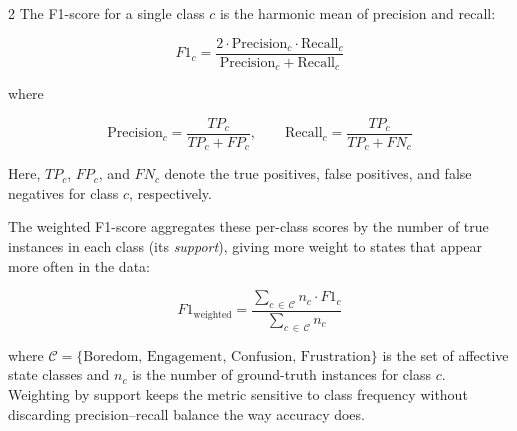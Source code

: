 \begin{multicols}{2}
  The F1-score for a single class $c$ is the harmonic mean of precision
  and recall:

  \begin{equation}
    F1_c = \frac{2 \cdot \text{Precision}_c \cdot \text{Recall}_c}
    {\text{Precision}_c + \text{Recall}_c}
    \label{eq:f1_class}
  \end{equation}

  \noindent
  where

  \begin{equation}
    \text{Precision}_c = \frac{TP_c}{TP_c + FP_c}, \qquad
    \text{Recall}_c    = \frac{TP_c}{TP_c + FN_c}
    \label{eq:prec_rec}
  \end{equation}

  \noindent
  Here, $TP_c$, $FP_c$, and $FN_c$ denote the true positives, false
  positives, and false negatives for class $c$, respectively.

  The weighted F1-score aggregates these per-class scores by the number
  of true instances in each class (its \emph{support}), giving more
  weight to states that appear more often in the data:

  {\setlength{\abovedisplayskip}{4pt}
    \setlength{\belowdisplayskip}{4pt}
    \setlength{\abovedisplayshortskip}{4pt}
    \setlength{\belowdisplayshortskip}{4pt}
    \begin{equation}
      F1_{\text{weighted}} =
      \frac{\displaystyle\sum_{c \,\in\, \mathcal{C}} n_c \cdot F1_c}
      {\displaystyle\sum_{c \,\in\, \mathcal{C}} n_c}
      \label{eq:f1_weighted}
  \end{equation}}

  \noindent
  where $\mathcal{C} = \{\text{Boredom, Engagement, Confusion,
  Frustration}\}$ is the set of affective state classes and $n_c$ is the
  number of ground-truth instances for class $c$. Weighting by support
  keeps the metric sensitive to class frequency without discarding
  precision--recall balance the way accuracy does.

\end{multicols}
